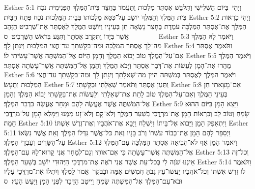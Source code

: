 Esther 5:1	וַיְהִי  בַּיּוֹם הַשְּׁלִישִׁי וַתִּלְבַּשׁ אֶסְתֵּר מַלְכוּת וַתַּעֲמֹד בַּחֲצַר בֵּית־הַמֶּלֶךְ הַפְּנִימִית נֹכַח בֵּית הַמֶּלֶךְ וְהַמֶּלֶךְ יוֹשֵׁב עַל־כִּסֵּא מַלְכוּתוֹ בְּבֵית הַמַּלְכוּת נֹכַח פֶּתַח הַבָּיִת׃
Esther 5:2	וַיְהִי כִרְאוֹת הַמֶּלֶךְ אֶת־אֶסְתֵּר הַמַּלְכָּה עֹמֶדֶת בֶּחָצֵר נָשְׂאָה חֵן בְּעֵינָיו וַיּוֹשֶׁט הַמֶּלֶךְ לְאֶסְתֵּר אֶת־שַׁרְבִיט הַזָּהָב אֲשֶׁר בְּיָדוֹ וַתִּקְרַב אֶסְתֵּר וַתִּגַּע בְּרֹאשׁ הַשַּׁרְבִיט׃ {ס}        
Esther 5:3	וַיֹּאמֶר לָהּ הַמֶּלֶךְ מַה־לָּךְ אֶסְתֵּר הַמַּלְכָּה וּמַה־בַּקָּשָׁתֵךְ עַד־חֲצִי הַמַּלְכוּת וְיִנָּתֵן לָךְ׃
Esther 5:4	וַתֹּאמֶר אֶסְתֵּר אִם־עַל־הַמֶּלֶךְ טוֹב יָבוֹא הַמֶּלֶךְ וְהָמָן הַיּוֹם אֶל־הַמִּשְׁתֶּה אֲשֶׁר־עָשִׂיתִי לוֹ׃
Esther 5:5	וַיֹּאמֶר הַמֶּלֶךְ מַהֲרוּ אֶת־הָמָן לַעֲשׂוֹת אֶת־דְּבַר אֶסְתֵּר וַיָּבֹא הַמֶּלֶךְ וְהָמָן אֶל־הַמִּשְׁתֶּה אֲשֶׁר־עָשְׂתָה אֶסְתֵּר׃
Esther 5:6	וַיֹּאמֶר הַמֶּלֶךְ לְאֶסְתֵּר בְּמִשְׁתֵּה הַיַּיִן מַה־שְּׁאֵלָתֵךְ וְיִנָּתֵן לָךְ וּמַה־בַּקָּשָׁתֵךְ עַד־חֲצִי הַמַּלְכוּת וְתֵעָשׂ׃
Esther 5:7	וַתַּעַן אֶסְתֵּר וַתֹּאמַר שְׁאֵלָתִי וּבַקָּשָׁתִי׃
Esther 5:8	אִם־מָצָאתִי חֵן בְּעֵינֵי הַמֶּלֶךְ וְאִם־עַל־הַמֶּלֶךְ טוֹב לָתֵת אֶת־שְׁאֵלָתִי וְלַעֲשׂוֹת אֶת־בַּקָּשָׁתִי יָבוֹא הַמֶּלֶךְ וְהָמָן אֶל־הַמִּשְׁתֶּה אֲשֶׁר אֶעֱשֶׂה לָהֶם וּמָחָר אֶעֱשֶׂה כִּדְבַר הַמֶּלֶךְ׃
Esther 5:9	וַיֵּצֵא הָמָן בַּיּוֹם הַהוּא שָׂמֵחַ וְטוֹב לֵב וְכִרְאוֹת הָמָן אֶת־מרְדֳּכַי בְּשַׁעַר הַמֶּלֶךְ וְלֹא־קָם וְלֹא־זָע מִמֶּנּוּ וַיִּמָּלֵא הָמָן עַל־מרְדֳּכַי חֵמָה׃
Esther 5:10	וַיִּתְאַפַּק הָמָן וַיָּבוֹא אֶל־בֵּיתוֹ וַיִּשְׁלַח וַיָּבֵא אֶת־אֹהֲבָיו וְאֶת־זֶרֶשׁ אִשְׁתּוֹ׃
Esther 5:11	וַיְסַפֵּר לָהֶם הָמָן אֶת־כְּבוֹד עשְׁרוֹ וְרֹב בָּנָיו וְאֵת כּל־אֲשֶׁר גִּדְּלוֹ הַמֶּלֶךְ וְאֵת אֲשֶׁר נִשְּׂאוֹ עַל־הַשָּׂרִים וְעַבְדֵי הַמֶּלֶךְ׃
Esther 5:12	וַיֹּאמֶר הָמָן אַף לֹא־הֵבִיאָה אֶסְתֵּר הַמַּלְכָּה עִם־הַמֶּלֶךְ אֶל־הַמִּשְׁתֶּה אֲשֶׁר־עָשָׂתָה כִּי אִם־אוֹתִי וְגַם־לְמָחָר אֲנִי קָרוּא־לָהּ עִם־הַמֶּלֶךְ׃
Esther 5:13	וְכל־זֶה אֵינֶנּוּ שֹׁוֶה לִי בְּכל־עֵת אֲשֶׁר אֲנִי רֹאֶה אֶת־מרְדֳּכַי הַיְּהוּדִי יוֹשֵׁב בְּשַׁעַר הַמֶּלֶךְ׃
Esther 5:14	וַתֹּאמֶר לוֹ זֶרֶשׁ אִשְׁתּוֹ וְכל־אֹהֲבָיו יַעֲשׂוּ־עֵץ גָּבֹהַּ חֲמִשִּׁים אַמָּה וּבַבֹּקֶר  אֱמֹר לַמֶּלֶךְ וְיִתְלוּ אֶת־מרְדֳּכַי עָלָיו וּבֹא־עִם־הַמֶּלֶךְ אֶל־הַמִּשְׁתֶּה שָׂמֵחַ וַיִּיטַב הַדָּבָר לִפְנֵי הָמָן וַיַּעַשׂ הָעֵץ׃ {ס}        
